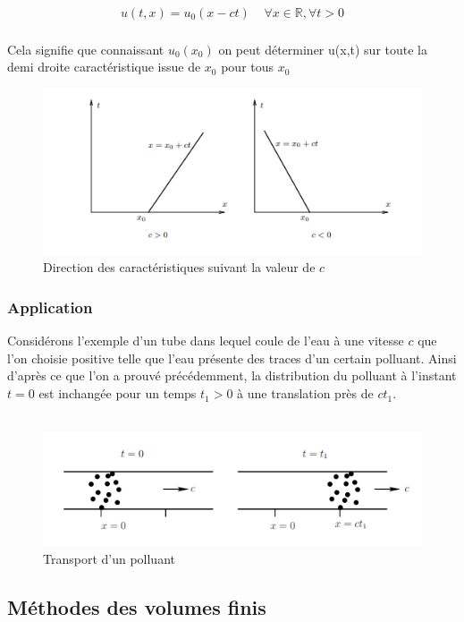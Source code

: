 \documentclass[12pt]{article}
\begin{document}
\begin{eqnarray}
        u(t,x)=u_0(x-ct) \;\;\;\;\forall x\in \mathbb{R}, \forall t>0 
\end{eqnarray}
\\ Cela signifie que connaissant $u_0(x_0)$ on peut déterminer u(x,t) sur toute la demi droite caractéristique issue de $x_0$ pour tous $x_0$
\\
\begin{figure}[H]
	\centering
	\includegraphics[scale=1]{dr.png}
	\caption{Direction des caractéristiques suivant la valeur de $c$}
	\label{1D}
	\end{figure} 
\subsubsection{Application}
Considérons l'exemple d'un tube dans lequel coule de l'eau à une vitesse $c$ que l'on choisie positive telle que l'eau présente des traces d'un certain polluant. Ainsi d'après ce que l'on a prouvé précédemment, la distribution du polluant à l'instant $t=0$ est inchangée pour un temps $t_1 > 0$ à une translation près de $ct_1$.
\\
\\\begin{figure}[H]
	\centering
	\includegraphics[scale=1]{transport_de_polluant.png}
	\caption{Transport d'un polluant}
	\label{1D}
	\end{figure}
	
	
\subsection{Méthodes des volumes finis}
\end{document}
